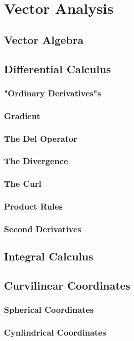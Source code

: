 \chapter{Vector Analysis}
\section{Vector Algebra}

\section{Differential Calculus}
\subsection{"Ordinary Derivatives"s}
\subsection{Gradient}
\subsection{The Del Operator}
\subsection{The Divergence}
\subsection{The Curl}
\subsection{Product Rules}
\subsection{Second Derivatives}
\section{Integral Calculus}

\section{Curvilinear Coordinates}
\subsection{Spherical Coordinates}
\subsection{Cynlindrical Coordinates}

